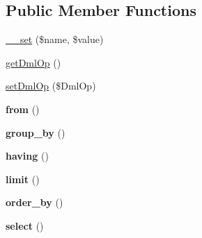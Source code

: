 \subsection*{Public Member Functions}
\begin{DoxyCompactItemize}
\item 
\hyperlink{class_able_polecat___query_language___statement_abstract_a83c2703c91959192f759992ad5640b67}{\+\_\+\+\_\+set} (\$name, \$value)
\item 
\hyperlink{class_able_polecat___query_language___statement_abstract_a0d3274dc69b5a32d134a11cca5dae6d1}{get\+Dml\+Op} ()
\item 
\hyperlink{class_able_polecat___query_language___statement_abstract_a1f112b4e45e5865f8547610268c72053}{set\+Dml\+Op} (\$Dml\+Op)
\item 
\hypertarget{class_able_polecat___query_language___statement_abstract_aad8562e0943850410c1a6026d743a991}{}{\bfseries from} ()\label{class_able_polecat___query_language___statement_abstract_aad8562e0943850410c1a6026d743a991}

\item 
\hypertarget{class_able_polecat___query_language___statement_abstract_a5b55f58cc35480124d3ea8551a80037f}{}{\bfseries group\+\_\+by} ()\label{class_able_polecat___query_language___statement_abstract_a5b55f58cc35480124d3ea8551a80037f}

\item 
\hypertarget{class_able_polecat___query_language___statement_abstract_a3e113757156cf56131af6f1cd1f2308e}{}{\bfseries having} ()\label{class_able_polecat___query_language___statement_abstract_a3e113757156cf56131af6f1cd1f2308e}

\item 
\hypertarget{class_able_polecat___query_language___statement_abstract_a63aed2ed30505623343b3e7df7fa6c16}{}{\bfseries limit} ()\label{class_able_polecat___query_language___statement_abstract_a63aed2ed30505623343b3e7df7fa6c16}

\item 
\hypertarget{class_able_polecat___query_language___statement_abstract_a2ee5053842ab84c0bffd4aa65360f1d0}{}{\bfseries order\+\_\+by} ()\label{class_able_polecat___query_language___statement_abstract_a2ee5053842ab84c0bffd4aa65360f1d0}

\item 
\hypertarget{class_able_polecat___query_language___statement_abstract_a701f78ac6d7ece9e18883fe7ee612e9f}{}{\bfseries select} ()\label{class_able_polecat___query_language___statement_abstract_a701f78ac6d7ece9e18883fe7ee612e9f}


\end{DoxyCompactItemize}
